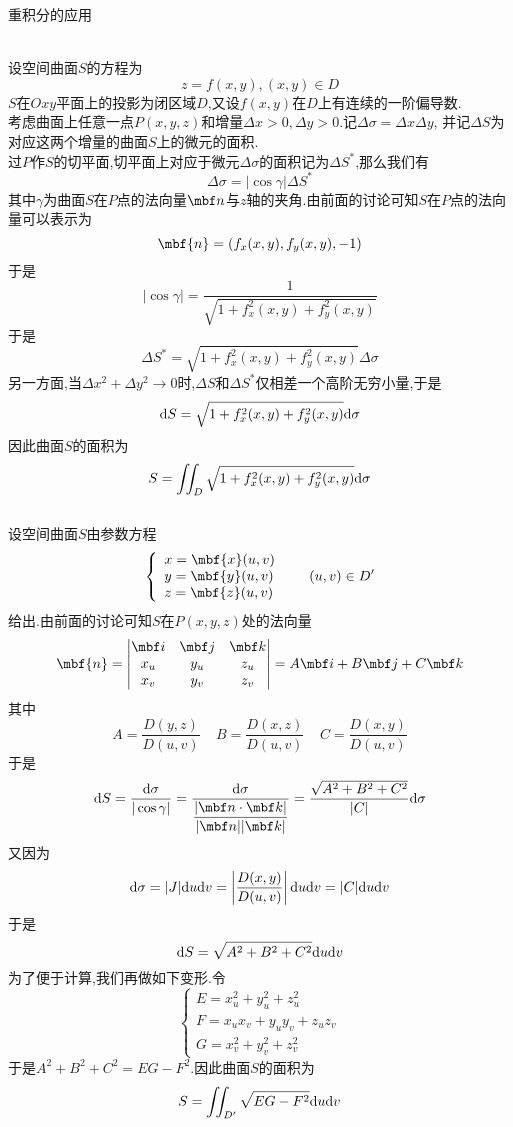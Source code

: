 \documentclass{ctexart}
\begin{document}
\pagestyle{empty}
\begin{center}\large 重积分的应用\end{center}
\\
设空间曲面$S$的方程为\[z=f(x,y),(x,y)\in D\]
$S$在$Oxy$平面上的投影为闭区域$D$,又设$f(x,y)$在$D$上有连续的一阶偏导数.\\
考虑曲面上任意一点$P(x,y,z)$和增量$\Delta x>0,\Delta y>0$.记$\Delta\sigma=\Delta x\Delta y$,%
并记$\Delta S$为对应这两个增量的曲面$S$上的微元的面积.\\
过$P$作$S$的切平面,切平面上对应于微元$\Delta\sigma$的面积记为$\Delta S^*$,那么我们有
\[\Delta\sigma=|\cos\gamma|\Delta S^*\]
其中$\gamma$为曲面$S$在$P$点的法向量$\mbf n$与$z$轴的夹角.由前面的讨论可知$S$在$P$点的法向量可以表示为
\[\mbf{n}=\left(f_x(x,y),f_y(x,y),-1\right)\]
于是\[|\cos\gamma|=\dfrac{1}{\sqrt{1+f_x^2(x,y)+f_y^2(x,y)}}\]
于是
\[\Delta S^*=\sqrt{1+f_x^2(x,y)+f_y^2(x,y)}\Delta\sigma\]
另一方面,当$\Delta x^2+\Delta y^2\to0$时,$\Delta S$和$\Delta S^*$仅相差一个高阶无穷小量,于是
\[\mathrm{d} S=\sqrt{1+f_x^2(x,y)+f_y^2(x,y)}\mathrm{d}\sigma\]
因此曲面$S$的面积为
\[S=\iint_{D}\sqrt{1+f_x^2(x,y)+f_y^2(x,y)}\mathrm{d}\sigma\]
\\
设空间曲面$S$由参数方程
\[\left\{\begin{array}{l}
    x=\mbf{x}(u,v)\\y=\mbf{y}(u,v)\\z=\mbf{z}(u,v)
\end{array}\right.\ \ \ \ \ (u,v)\in D'\]
给出.由前面的讨论可知$S$在$P(x,y,z)$处的法向量
\[\mbf{n}=\begin{vmatrix}
    \mbf i & \mbf j & \mbf k \\
    x_u & y_u & z_u \\
    x_v & y_v & z_v
\end{vmatrix}=A\mbf i+B\mbf j+C\mbf k\]
其中
\[A=\dfrac{D(y,z)}{D(u,v)}\ \ \ \ \ B=\dfrac{D(x,z)}{D(u,v)}\ \ \ \ \ C=\dfrac{D(x,y)}{D(u,v)}\]
于是
\[\di S=\dfrac{\di\sigma}{|\cos\gamma|}=\dfrac{\di\sigma}{\dfrac{|\mbf n\cdot\mbf k|}{|\mbf n||\mbf k|}}=\dfrac{\sqrt{A^2+B^2+C^2}}{|C|}\di\sigma\]
又因为
\[\mathrm{d}\sigma=|J|\mathrm{d} u\mathrm{d} v=\left|\dfrac{D(x,y)}{D(u,v)}\right|\mathrm{d} u\mathrm{d} v=|C|\mathrm{d} u\mathrm{d} v\]
于是
\[\mathrm{d} S=\sqrt{A^2+B^2+C^2}\mathrm{d} u\mathrm{d} v\]
为了便于计算,我们再做如下变形.令
\[\left\{\begin{array}{l}
    E=x_u^2+y_u^2+z_u^2\\
    F=x_ux_v+y_uy_v+z_uz_v\\
    G=x_v^2+y_v^2+z_v^2
\end{array}\right.\]
于是$A^2+B^2+C^2=EG-F^2$.因此曲面$S$的面积为
\[S=\iint_{D'}\sqrt{EG-F^2}\mathrm{d} u\mathrm{d} v\]
\end{document}
